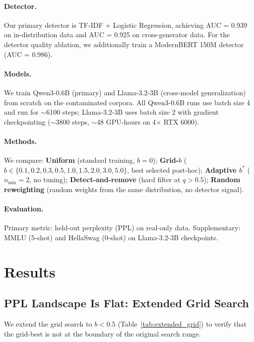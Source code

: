 \documentclass[11pt,a4paper]{article}
\newcommand{\bstar}{b^{*}}
\newcommand{\nmin}{n_{\min}}
\begin{document}
\paragraph{Detector.}
Our primary detector is TF-IDF + Logistic Regression, achieving AUC = 0.939 on in-distribution data and AUC = 0.925 on cross-generator data.
For the detector quality ablation, we additionally train a ModernBERT 150M detector (AUC = 0.986).

\paragraph{Models.}
We train Qwen3-0.6B (primary) and Llama-3.2-3B (cross-model generalization) from scratch on the contaminated corpora.
All Qwen3-0.6B runs use batch size 4 and run for $\sim$6100 steps; Llama-3.2-3B uses batch size 2 with gradient checkpointing ($\sim$3800 steps, $\sim$48 GPU-hours on 4$\times$ RTX 6000).

\paragraph{Methods.}
We compare: \textbf{Uniform} (standard training, $b{=}0$); \textbf{Grid-$b$} ($b \in \{0.1, 0.2, 0.3, 0.5, 1.0, 1.5, 2.0, 3.0, 5.0\}$, best selected post-hoc); \textbf{Adaptive $\bstar$} ($\nmin{=}2$, no tuning); \textbf{Detect-and-remove} (hard filter at $q{>}0.5$); \textbf{Random reweighting} (random weights from the same distribution, no detector signal).

\paragraph{Evaluation.}
Primary metric: held-out perplexity (PPL) on real-only data.
Supplementary: MMLU (5-shot) and HellaSwag (0-shot) on Llama-3.2-3B checkpoints.

\section{Results}
\label{sec:results}

\subsection{PPL Landscape Is Flat: Extended Grid Search}
\label{sec:grid_extended}

We extend the grid search to $b < 0.5$ (Table~\ref{tab:extended_grid}) to verify that the grid-best is not at the boundary of the original search range.
\end{document}
